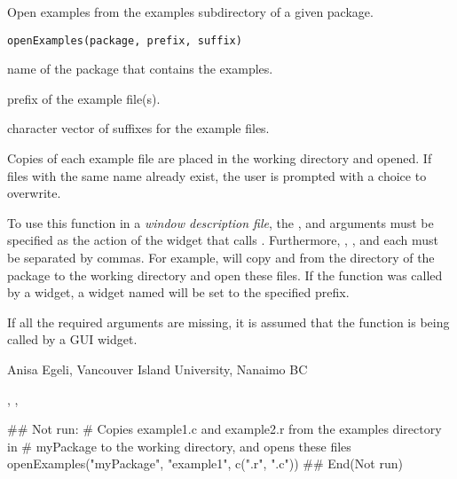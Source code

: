 \documentclass[letterpaper]{book}
\begin{document}
\begin{Description}\relax
Open examples from the examples subdirectory of a given package.
\end{Description}
\begin{Usage}
\begin{verbatim}
openExamples(package, prefix, suffix)
\end{verbatim}
\end{Usage}
\begin{Arguments}
\begin{ldescription}
\item[\code{package}] name of the package that contains the examples.
\item[\code{prefix}] prefix of the example file(s).
\item[\code{suffix}] character vector of suffixes for the example files.
\end{ldescription}
\end{Arguments}
\begin{Details}\relax
Copies of each example file are placed in the working directory 
and opened. If files with the same name already exist, the user 
is prompted with a choice to overwrite.

To use this function in a \emph{window description file}, the 
,  and  arguments must 
be specified as the action of the widget that calls 
. Furthermore, , , 
and each  must be separated by commas. For example, 
 will copy  
and  from the  directory of the 
package  to the working directory and open these 
files. If the function was called by a widget, a widget named 
 will be set to the specified prefix.
\end{Details}
\begin{Note}\relax
If all the required arguments are missing, it is assumed 
that the function is being called by a GUI widget.
\end{Note}
\begin{Author}\relax
Anisa Egeli, Vancouver Island University, Nanaimo BC
\end{Author}
\begin{SeeAlso}\relax
{}, ,
\end{SeeAlso}
\begin{Examples}
\begin{ExampleCode}
## Not run: 
# Copies example1.c and example2.r from the examples directory in 
# myPackage to the working directory, and opens these files
openExamples("myPackage", "example1", c(".r", ".c"))
## End(Not run)
\end{ExampleCode}
\end{Examples}
\end{document}
